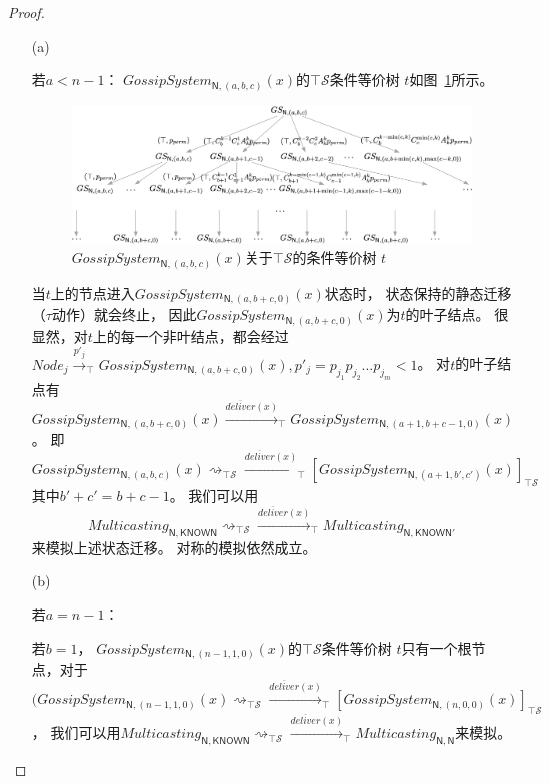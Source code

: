 \begin{proof}
\begin{itemize}
{        %
        \begin{itemize}
            \item[(a)] {若$a<n-1$：
            $GossipSystem_{\mathsf{N},(a,b,c)}(x)$的$\top \mathcal{S}$条件等价树 $t$如图~\ref{fig:epsilon_1}所示。
            \begin{figure}[!htbp]
            	\small
            	\centering
            	\includegraphics[width=14cm]{../figures/epsilon_tree1.png}
                \caption{$GossipSystem_{\mathsf{N},(a,b,c)}(x)$关于$\top\mathcal{S}$的条件等价树 $t$}
                \label{fig:epsilon_1}
            \end{figure}
            当$t$上的节点进入$GossipSystem_{\mathsf{N},(a,b+c,0)}(x)$状态时，
            状态保持的静态迁移（$\tau$动作）就会终止，
            因此$GossipSystem_{\mathsf{N},(a,b+c,0)}(x)$为$t$的叶子结点。
            很显然，对$t$上的每一个非叶结点，都会经过$Node_j\stackrel{p'_j}{\rightarrow}_{\top}GossipSystem_{\mathsf{N},(a,b+c,0)}(x),p'_j=p_{j_1}p_{j_2}\dots p_{j_m}<1$。
            对$t$的叶子结点有$GossipSystem_{\mathsf{N},(a,b+c,0)}(x)\stackrel{\overline{deliver}(x)}{\longrightarrow}_{\top} GossipSystem_{\mathsf{N},(a+1,b+c-1,0)}(x)$。
            即
            $$GossipSystem_{\mathsf{N},(a,b,c)}(x)\rightsquigarrow_{\top\mathcal{S}}\stackrel{\overline{deliver}(x)}{\longrightarrow}_{\top}[GossipSystem_{\mathsf{N},(a+1,b',c')}(x)]_{\top\mathcal{S}}$$
            其中$b'+c'=b+c-1$。
            我们可以用$$Multicasting_{\mathsf{N},\mathsf{KNOWN}}\rightsquigarrow_{\top\mathcal{S}}\stackrel{\overline{deliver}(x)}{\longrightarrow}_{\top} Multicasting_{\mathsf{N}, \mathsf{KNOWN}'}$$来模拟上述状态迁移。
            对称的模拟依然成立。
            }
            \item[(b)] {若$a=n-1$：
             
                  若$b=1$，
                  $GossipSystem_{\mathsf{N},(n-1,1,0)}(x)$的$\top \mathcal{S}$条件等价树 $t$只有一个根节点，对于
                  $(GossipSystem_{\mathsf{N},(n-1,1,0)}(x)\rightsquigarrow_{\top\mathcal{S}}\stackrel{\overline{deliver}(x)}{\longrightarrow}_{\top}[GossipSystem_{\mathsf{N},(n,0,0)}(x)]_{\top\mathcal{S}}$，
                  我们可以用$Multicasting_{\mathsf{N},\mathsf{KNOWN}}\rightsquigarrow_{\top\mathcal{S}}\stackrel{\overline{deliver}(x)}{\longrightarrow}_{\top} Multicasting_{\mathsf{N}, \mathsf{N}}$来模拟。
               
}
\end{itemize}}
\end{itemize}
\end{proof}
